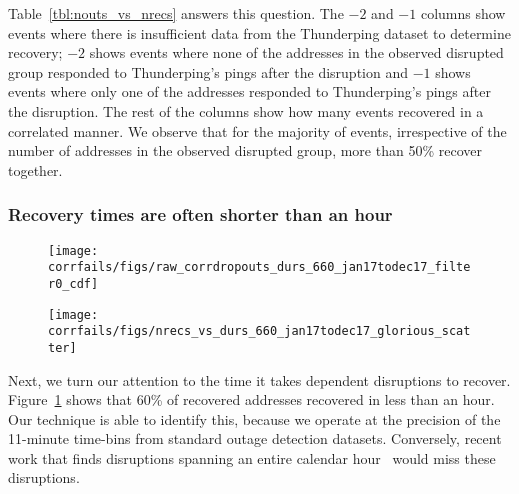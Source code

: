 Table~\ref{tbl:nouts_vs_nrecs} answers this question. The $-2$ and
$-1$ columns show events where there is insufficient data from the
Thunderping dataset to determine recovery; $-2$ shows events where
none of the addresses in the observed disrupted group responded to
Thunderping's pings after the disruption and $-1$ shows events where only
one of the addresses responded to Thunderping's pings after the
disruption. The rest of the columns show how many events recovered in a
correlated manner. We observe that for the majority of events,
irrespective of the number of addresses in the observed disrupted
group, more than 50\% recover together.


\subsubsection*{Recovery times are often shorter than an hour}


\begin{figure*}[t]
\begin{subfigure}[t]{0.47\linewidth}
\centering
\texttt{[image: corrfails/figs/raw\_corrdropouts\_durs\_660\_jan17todec17\_filter0\_cdf]}
\caption{
\label{fig:corrdropouts_durs}
}
\end{subfigure}
%
\hfill
%
\begin{subfigure}[t]{0.47\linewidth}
  \centering
  \texttt{[image: corrfails/figs/nrecs\_vs\_durs\_660\_jan17todec17\_glorious\_scatter]}
  \caption{
    \label{fig:nrecs_vs_durs}
}
\end{subfigure}
%
%
\caption{
\label{fig:rec_durs}
(a)~The distribution of durations of dependent dropouts for all addresses that
recovered in a correlated manner. 60\% of addresses recovered in less than an hour.
(b)~For dependent dropout events where at least two addresses recovered,
this shows the number of addresses that recovered on the x-axis and the
corresponding recovery duration for the event on the y-axis. Dependent
dropout events vary in their duration irrespective of the number of
affected addresses.
}
\end{figure*}

Next, we turn our attention to the time it takes dependent disruptions
to recover.
%
Figure~\ref{fig:corrdropouts_durs} shows that 60\% of recovered
addresses recovered in less than an hour.
%
Our technique is able to identify this, because we operate at the
precision of the 11-minute time-bins from standard outage detection
datasets.
%
Conversely, recent work that finds disruptions spanning an entire
calendar hour~\cite{advancing-outage-art} would miss these disruptions.


